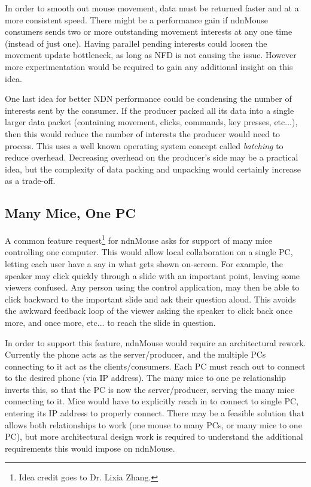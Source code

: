 \documentclass{sig-alternate}
\renewcommand\_{\textunderscore\allowbreak}  %
\begin{document}
In order to smooth out mouse movement, data must be returned faster and at a more consistent speed. There might be a performance gain if ndnMouse consumers sends two or more outstanding movement interests at any one time (instead of just one). Having parallel pending interests could loosen the movement update bottleneck, as long as NFD is not causing the issue. However more experimentation would be required to gain any additional insight on this idea.

One last idea for better NDN performance could be condensing the number of interests sent by the consumer. If the producer packed all its data into a single larger data packet (containing movement, clicks, commands, key presses, etc...), then this would reduce the number of interests the producer would need to process. This uses a well known operating system concept called \textit{batching} to reduce overhead. Decreasing overhead on the producer's side may be a practical idea, but the complexity of data packing and unpacking would certainly increase as a trade-off.

\subsection{Many Mice, One PC}
A common feature request\footnote{Idea credit goes to Dr. Lixia Zhang.} for ndnMouse asks for support of many mice controlling one computer. This would allow local collaboration on a single PC, letting each user have a say in what gets shown on-screen. For example, the speaker may click quickly through a slide with an important point, leaving some viewers confused. Any person using the control application, may then be able to click backward to the important slide and ask their question aloud. This avoids the awkward feedback loop of the viewer asking the speaker to click back once more, and once more, etc... to reach the slide in question.

In order to support this feature, ndnMouse would require an architectural rework. Currently the phone acts as the server/producer, and the multiple PCs connecting to it act as the clients/consumers. Each PC must reach out to connect to the desired phone (via IP address). The many mice to one pc relationship inverts this, so that the PC is now the server/producer, serving the many mice connecting to it. Mice would have to explicitly reach in to connect to single PC, entering its IP address to properly connect. There may be a feasible solution that allows both relationships to work (one mouse to many PCs, or many mice to one PC), but more architectural design work is required to understand the additional requirements this would impose on ndnMouse.
\end{document}
